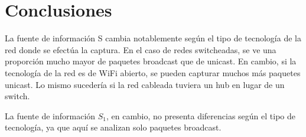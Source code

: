
\section{Conclusiones}

    
 La fuente de información S cambia notablemente según el tipo de tecnología de la red donde se efectúa la captura. En el caso de redes switcheadas, se ve una proporción mucho mayor de paquetes broadcast que de unicast. En cambio, si la tecnología de la red es de WiFi abierto, se pueden capturar muchos más paquetes unicast. Lo mismo sucedería si la red cableada tuviera un hub en lugar de un switch.
 
 La fuente de información $S_1$, en cambio, no presenta diferencias según el tipo de tecnología, ya que aquí se analizan solo paquetes broadcast.
 

\begin{figure}[H]
\end{figure}

